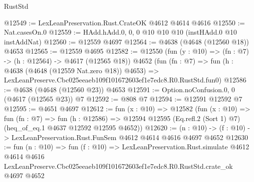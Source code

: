 \begin{lexlean}{RustStd}
\begin{coremodule}
@12549 := LexLeanPreservation.Rust.CrateOK @4612 @4614 @4616
@12550 := Nat.casesOn.{0}
@12559 := HAdd.hAdd.{0, 0, 0} @10 @10 @10 (instHAdd.{0} @10 instAddNat)
@12560 := @12559 @4697
@12564 := @4638 (@4648 (@12560 @18)) @4653
@12565 := @12559 @4695
@12582 := @12550
    (fun (y : @10) => (fn : @7) -> (h : @12564) -> @4617 (@12565 @18))
    @4652
    (fun (fn : @7) =>
    fun (h : @4638 (@4648 (@12559 Nat.zero @18)) @4653) =>
    LexLeanPreserve.Cbc025eeaeb109f101672603ef1e7edc8.R0.RustStd.fun0)
@12586 := @4638 (@4648 (@12560 @23)) @4653
@12591 := Option.noConfusion.{0, 0} (@4617 (@12565 @23)) @7
@12592 := @808 @7
@12594 := @12591 @12592 @7
@12595 := @4651 @4697
@12612 := fun (x : @10) =>
  @12582
    (fun (x : @10) =>
    fun (fn : @7) =>
    fun (h : @12586) =>
    @12594 @12595 (Eq.refl.{2} (Sort 1) @7) (heq_of_eq.{1} @4637 @12592 @12595 @4652))
@12620 := (n : @10) -> (f : @10) -> LexLeanPreservation.Rust.FunSem @4612 @4614 @4616 @4697 @4652
@12630 := fun (n : @10) =>
  fun (f : @10) =>
  LexLeanPreservation.Rust.simulate
    @4612
    @4614
    @4616
    LexLeanPreserve.Cbc025eeaeb109f101672603ef1e7edc8.R0.RustStd.crate_ok
    @4697
    @4652
\end{coremodule}
\end{lexlean}

